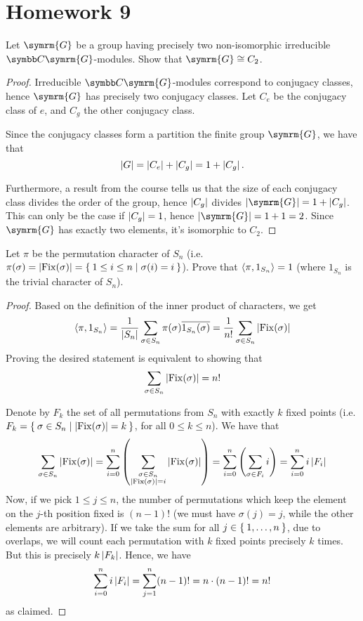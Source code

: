 \section*{Homework 9}

\begin{exercise}
Let \(\symrm{G}\) be a group having precisely two non-isomorphic irreducible \(\complex \symrm{G}\)-modules. Show that \(\symrm{G} \cong C_2\).
\end{exercise}
\begin{proof}
Irreducible \(\complex \symrm{G}\)-modules correspond to conjugacy classes, hence \(\symrm{G}\) has precisely two conjugacy classes. Let \(C_e\) be the conjugacy class of \(e\), and \(C_g\) the other conjugacy class.

Since the conjugacy classes form a partition the finite group \(\symrm{G}\), we have that
\[
    \left|G\right| = \left|C_e\right| + \left|C_g\right| = 1 + \left|C_g\right|.
\]

Furthermore, a result from the course tells us that the size of each conjugacy class divides the order of the group, hence \(\left|C_g\right|\) divides \(\abs{\symrm{G}} = 1 + \abs{C_g}\). This can only be the case if \(\left|C_g\right| = 1\), hence \(\abs{\symrm{G}} = 1 + 1 = 2\). Since \(\symrm{G}\) has exactly two elements, it's isomorphic to \(C_2\).
\end{proof}

\begin{exercise}
Let \(\pi\) be the permutation character of \(S_n\) (i.e. \(\pi(\sigma) = \left|\operatorname*{Fix}(\sigma)\right| = \Set{ 1 \leq i \leq n | \sigma(i) = i }\)). Prove that \(\left\langle\pi, 1_{S_n}\right\rangle = 1\) (where \(1_{S_n}\) is the trivial character of \(S_n\)).
\end{exercise}
\begin{proof}
Based on the definition of the inner product of characters, we get
\[
    \left\langle\pi, 1_{S_n}\right\rangle = \frac{1}{\left|S_n\right|} \sum_{\sigma \in S_n} \pi(\sigma) \overline{1_{S_n}(\sigma)} = \frac{1}{n!} \sum_{\sigma \in S_n} \left|\operatorname*{Fix}(\sigma)\right|
\]
Proving the desired statement is equivalent to showing that
\[
    \sum_{\sigma \in S_n} \left|\operatorname*{Fix}(\sigma)\right| = n!
\]

Denote by \(F_k\) the set of all permutations from \(S_n\) with exactly \(k\) fixed points (i.e. \(F_k = \Set{ \sigma \in S_n | \left|\operatorname*{Fix}(\sigma)\right| = k }\), for all \(0 \leq k \leq n\)). We have that
\[
    \sum_{\sigma \in S_n} \left|\operatorname*{Fix}(\sigma)\right|
    = \sum_{i = 0}^{n} \left(\sum_{\substack{\sigma \in S_n \\ \left|\operatorname*{Fix}(\sigma)\right| = i}} \left|\operatorname*{Fix}(\sigma)\right|\right)
    = \sum_{i = 0}^{n} \left(\sum_{\sigma \in F_i} i\right)
    = \sum_{i = 0}^{n} i \left|F_i\right|
\]
Now, if we pick \(1 \leq j \leq n\), the number of permutations which keep the element on the \(j\)-th position fixed is \((n - 1)!\) (we must have \(\sigma(j) = j\), while the other elements are arbitrary). If we take the sum for all \(j \in \Set{1, \dots, n}\), due to overlaps, we will count each permutation with \(k\) fixed points precisely \(k\) times. But this is precisely \(k \left|F_k\right|\). Hence, we have
\[
    \sum_{i = 0}^{n} i \left|F_i\right| = \sum_{j = 1}^{n} (n - 1)! = n \cdot (n - 1)! = n!
\]
as claimed.
\end{proof}


